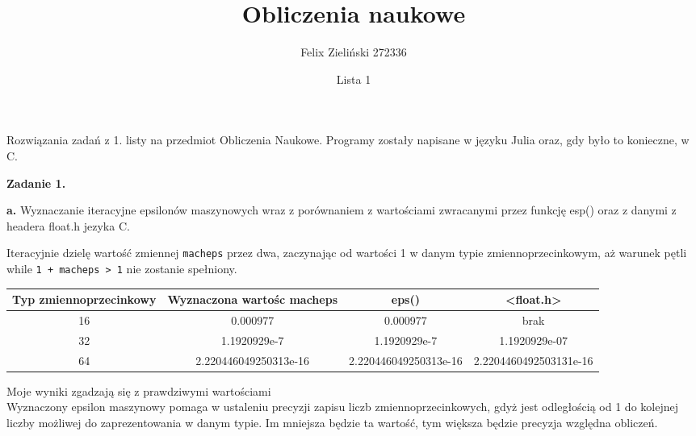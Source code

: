\documentclass[15pt, a4paper]{article}
\title{Obliczenia naukowe}
\author{Felix Zieliński 272336}
\date{Lista 1}
\begin{document}
\maketitle
Rozwiązania zadań z 1. listy na przedmiot Obliczenia Naukowe. Programy zostały napisane w języku Julia oraz, gdy było to konieczne, w C.

\vspace{0.5cm}

\noindent\hrulefill


\vspace{0.5cm}

\noindent\textbf{Zadanie 1.} 

\textbf{a.} Wyznaczanie iteracyjne epsilonów maszynowych wraz z porównaniem z wartościami zwracanymi przez funkcję esp() oraz z danymi z headera float.h jezyka C.

\vspace{0.5cm}

Iteracyjnie dzielę wartość zmiennej \verb|macheps| przez dwa, zaczynając od wartości 1 w danym typie zmiennoprzecinkowym, aż warunek pętli while \verb|1 + macheps > 1| nie zostanie spełniony. 


\begin{table}[ht]
    \begin{adjustbox}{max width=\textwidth}
    \begin{tabular}{|c|c|c|c|}
        \hline 
        Typ zmiennoprzecinkowy & Wyznaczona wartośc macheps & eps() & <float.h> \\ \hline
        16 & 0.000977 & 0.000977 & brak \\ \hline
        32 & 1.1920929e-7 & 1.1920929e-7 & 1.1920929e-07  \\ \hline
        64 & 2.220446049250313e-16 & 2.220446049250313e-16 &  2.2204460492503131e-16 \\ \hline
    \end{tabular}
    \end{adjustbox}
    \label{tab:macheps}
\end{table}

Moje wyniki zgadzają się z prawdziwymi wartościami \\
Wyznaczony epsilon maszynowy pomaga w ustaleniu precyzji zapisu liczb zmiennoprzecinkowych, gdyż jest odległością od 1 do kolejnej liczby możliwej do zaprezentowania w danym typie. Im mniejsza będzie ta wartość, tym większa będzie precyzja względna obliczeń.
\end{document}
